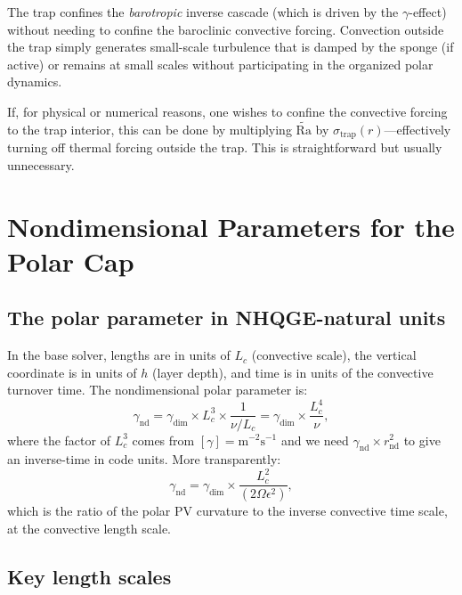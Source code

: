 \documentclass[11pt]{article}
\newcommand{\Rav}{\widetilde{\mathrm{Ra}}}
\newcommand{\Lc}{L_c}
\begin{document}
The trap confines the \emph{barotropic} inverse cascade (which is driven by the $\gamma$-effect) without needing to confine the baroclinic convective forcing. Convection outside the trap simply generates small-scale turbulence that is damped by the sponge (if active) or remains at small scales without participating in the organized polar dynamics.

If, for physical or numerical reasons, one wishes to confine the convective forcing to the trap interior, this can be done by multiplying $\Rav$ by $\sigma_{\mathrm{trap}}(r)$---effectively turning off thermal forcing outside the trap. This is straightforward but usually unnecessary.


\section{Nondimensional Parameters for the Polar Cap}
\label{sec:params_polar}

\subsection{The polar parameter in NHQGE-natural units}

In the base solver, lengths are in units of $\Lc$ (convective scale), the vertical coordinate is in units of $h$ (layer depth), and time is in units of the convective turnover time. The nondimensional polar parameter is:
\begin{equation}
\gamma_{\mathrm{nd}} = \gamma_{\mathrm{dim}} \times \Lc^3 \times \frac{1}{\nu/\Lc} = \gamma_{\mathrm{dim}} \times \frac{\Lc^4}{\nu},
\end{equation}
where the factor of $\Lc^3$ comes from $[\gamma] = \mathrm{m}^{-2}\mathrm{s}^{-1}$ and we need $\gamma_{\mathrm{nd}} \times r_{\mathrm{nd}}^2$ to give an inverse-time in code units. More transparently:
\begin{equation}
\gamma_{\mathrm{nd}} = \gamma_{\mathrm{dim}} \times \frac{\Lc^2}{(2\Omega\epsilon^2)},
\end{equation}
which is the ratio of the polar PV curvature to the inverse convective time scale, at the convective length scale.

\subsection{Key length scales}
\end{document}
